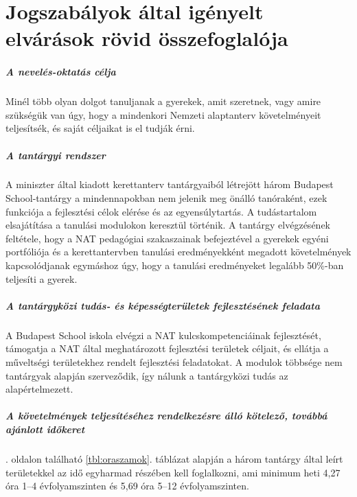 \chapter{Jogszabályok által igényelt elvárások rövid összefoglalója}
\label{sec:jogszabalyok}
\paragraph{A nevelés-oktatás célja}

Minél több olyan dolgot tanuljanak a gyerekek, amit szeretnek, vagy
amire szükségük van úgy, hogy a mindenkori Nemzeti alaptanterv követelményeit
teljesítsék, és saját céljaikat is el tudják érni.

\paragraph{A tantárgyi rendszer}

A miniszter által kiadott kerettanterv tantárgyaiból létrejött
három Budapest School-tantárgy a mindennapokban nem jelenik meg önálló
tanóraként, ezek funkciója a fejlesztési célok elérése és az egyensúlytartás. A
tudástartalom elsajátítása a tanulási modulokon keresztül történik. A tantárgy
elvégzésének feltétele, hogy a NAT pedagógiai szakaszainak befejeztével a
gyerekek egyéni portfóliója és a kerettantervben tanulási eredményekként
megadott követelmények kapcsolódjanak
egymáshoz úgy, hogy a tanulási eredményeket legalább 50\%-ban teljesíti a gyerek.

\paragraph{A tantárgyközi tudás- és képességterületek fejlesztésének feladata}

A Budapest School iskola elvégzi a NAT kulcskompetenciáinak
fejlesztését, támogatja a NAT által meghatározott fejlesztési területek céljait,
és ellátja a műveltségi területekhez rendelt fejlesztési feladatokat.
A modulok többsége nem tantárgyak alapján szerveződik, így nálunk a
tantárgyközi tudás az alapértelmezett.

\paragraph{A követelmények teljesítéséhez rendelkezésre álló kötelező, továbbá
    ajánlott időkeret}

. oldalon található \ref{tbl:oraszamok}. táblázat
alapján a három tantárgy által leírt területekkel az idő egyharmad részében
kell foglalkozni, ami minimum heti 4,27 óra 1--4 évfolyamszinten és 5,69 óra
5--12 évfolyamszinten.

